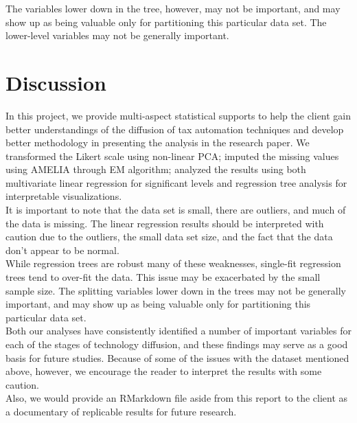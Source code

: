\documentclass[12pt]{article}
\begin{document}
The variables lower down in the tree, however, may not be important, and may show up as being valuable only for partitioning this particular data set. The lower-level variables may not be generally important. 

\section{Discussion}

In this project, we provide multi-aspect statistical supports to help the client gain better understandings of the diffusion of tax automation techniques and develop better methodology in presenting the analysis in the research paper. We transformed the Likert scale using non-linear PCA; imputed the missing values using AMELIA through EM algorithm; analyzed the results using both multivariate linear regression for significant levels and regression tree analysis for interpretable visualizations. \\

It is important to note that the data set is small, there are outliers, and much of the data is missing. The linear regression results should be interpreted with caution due to the outliers, the small data set size, and the fact that the data don't appear to be normal. \\

While regression trees are robust many of these weaknesses, single-fit regression trees tend to over-fit the data. This issue may be exacerbated by the small sample size. The splitting variables lower down in the trees may not be generally important, and may show up as being valuable only for partitioning this particular data set.\\

Both our analyses have consistently identified a number of important variables for each of the stages of technology diffusion, and these findings may serve as a good basis for future studies. Because of some of the issues with the dataset mentioned above, however, we encourage the reader to interpret the results with some caution. \\


Also, we would provide an RMarkdown file aside from this report to the client as a documentary of replicable results for future research.





\end{document}
